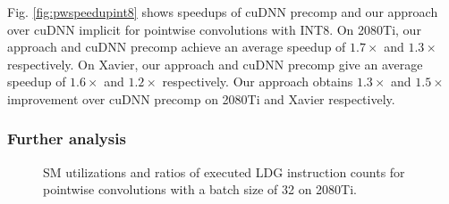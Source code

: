   Fig. \ref{fig:pwspeedupint8} shows speedups of cuDNN precomp and our approach over cuDNN implicit for
pointwise convolutions with INT8. On 2080Ti, our approach and cuDNN precomp achieve an average speedup of $1.7\times$ and $1.3\times$
respectively. On Xavier, our approach and cuDNN precomp give an average speedup of $1.6\times$ and $1.2\times$ respectively. Our approach
obtains $1.3\times$ and $1.5\times$ improvement over cuDNN precomp on 2080Ti and Xavier respectively.


\subsubsection{Further analysis}
\begin{figure}[t!]
    \centering
    \qquad

    \vspace{-2mm}
    \caption{SM utilizations and ratios of executed LDG instruction counts for pointwise convolutions with a batch size of 32 on 2080Ti.}
    \label{fig:pwinfo}
\end{figure}

